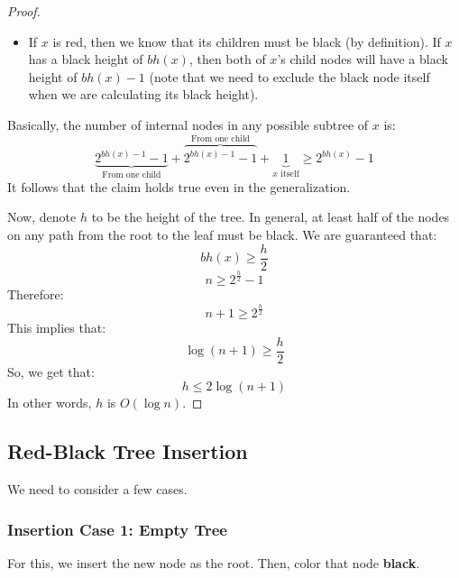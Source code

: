 \documentclass[letterpaper]{article}
\begin{document}
\begin{mdframed}
\begin{proof}
\begin{itemize}
\begin{itemize}
                \item If $x$ is red, then we know that its children must be black (by definition). If $x$ has a black height of $bh(x)$, then both of $x$'s child nodes will have a black height of $bh(x) - 1$ (note that we need to exclude the black node itself when we are calculating its black height). 
            \end{itemize}
            Basically, the number of internal nodes in any possible subtree of $x$ is:
            \[\underbrace{2^{bh(x) - 1} - 1}_{\text{From one child}} + \overbrace{2^{bh(x) - 1} - 1}^{\text{From one child}} + \underbrace{1}_{x \text{ itself}} \geq 2^{bh(x)} - 1\]
            It follows that the claim holds true even in the generalization.  
        \end{itemize}
        Now, denote $h$ to be the height of the tree. In general, at least half of the nodes on any path from the root to the leaf must be black. We are guaranteed that: 
        \[bh(x) \geq \frac{h}{2}\]
        \[n \geq 2^{\frac{h}{2}} - 1\]
        Therefore: 
        \[n + 1 \geq 2^{\frac{h}{2}}\]
        This implies that: 
        \[\log(n + 1) \geq \frac{h}{2}\]
        So, we get that: 
        \[h \leq 2 \log(n + 1)\]
        In other words, $h$ is $O(\log n)$. 
    \end{proof}
\end{mdframed}

\subsection{Red-Black Tree Insertion}
We need to consider a few cases. 

\subsubsection{Insertion Case 1: Empty Tree}
For this, we insert the new node as the root. Then, color that node \textbf{black}. 
\end{document}
